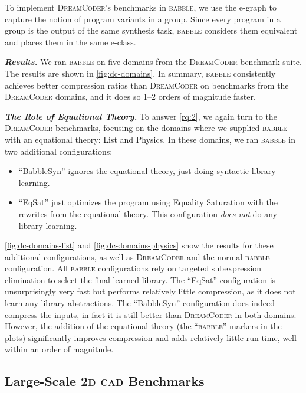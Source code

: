 \documentclass[acmsmall,screen,nonacm,review=false,timestamp=false]{acmart}
\newcommand{\emphbf}[1]{\emph{\textbf{#1}\xspace}}
\newcommand{\mypara}[1]{\smallskip\noindent\emphbf{#1.}\xspace}
\newcommand{\egraph}{e-graph\xspace}
\newcommand{\eclass}{e-class\xspace}
\newcommand{\tname}[1]{\textsc{#1}\xspace}
\newcommand{\tool}{\tname{babble}}
\newcommand{\dc}{\tname{DreamCoder}}
\newcommand{\cogsci}{\tname{2d cad}}
\begin{document}
To implement \dc's benchmarks in \tool,
 we use the \egraph to capture the notion of program variants in a group.
Since every program in a group is the output of the same synthesis task,
 \tool considers them equivalent and places them in the same \eclass.




\mypara{Results}
We ran \tool on five domains from the \dc benchmark suite.
The results are shown in \autoref{fig:dc-domains}.
In summary,
 \tool consistently achieves better compression ratios than
 \dc on benchmarks from the \dc domains,
 and it does so 1--2 orders of magnitude faster.




\mypara{The Role of Equational Theory}
\label{sec:ablation}
To answer \ref{rq:2},
 we again turn to the \dc benchmarks,
 focusing on the domains where we supplied \tool
 with an equational theory: List and Physics.
In these domains, we ran \tool in two additional configurations:
\begin{itemize}
  \item ``BabbleSyn'' ignores the equational theory, just doing syntactic library learning.
  \item ``EqSat'' just optimizes the program using Equality Saturation with the
        rewrites from the equational theory.
        This configuration \emph{does not} do any library learning.
\end{itemize}
\autoref{fig:dc-domains-list} and \ref{fig:dc-domains-physics}
 show the results for these additional configurations,
 as well as \dc and the normal \tool configuration.
All \tool configurations rely on
  targeted subexpression elimination
  to select the final learned library.
The ``EqSat'' configuration is unsurprisingly very fast
 but performs relatively little compression,
 as it does not learn any library abstractions.
The ``BabbleSyn'' configuration
 does indeed compress the inputs,
 in fact it is still better than \dc in both domains.
However,
 the addition of the equational theory (the ``\tool'' markers in the plots)
 significantly improves compression
 and adds relatively little run time,
 well within an order of magnitude.

\subsection{Large-Scale \cogsci Benchmarks}
\end{document}
